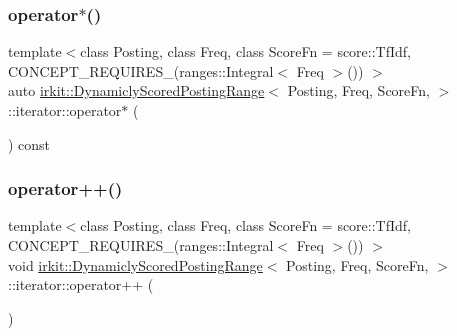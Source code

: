 \mbox{\label{classirkit_1_1DynamiclyScoredPostingRange_1_1iterator_a1608a0963401d8842b1f0e3726e44449}} 
\subsubsection{\texorpdfstring{operator$\ast$()}{operator*()}}
{\footnotesize\ttfamily template$<$class Posting, class Freq, class Score\+Fn = score\+::\+Tf\+Idf, C\+O\+N\+C\+E\+P\+T\+\_\+\+R\+E\+Q\+U\+I\+R\+E\+S\+\_\+(ranges\+::\+Integral$<$ Freq $>$()) $>$ \\
auto \hyperlink{classirkit_1_1DynamiclyScoredPostingRange}{irkit\+::\+Dynamicly\+Scored\+Posting\+Range}$<$ Posting, Freq, Score\+Fn, $>$\+::iterator\+::operator$\ast$ (\begin{DoxyParamCaption}{ }\end{DoxyParamCaption}) const\hspace{0.3cm}{\ttfamily [inline]}}

\mbox{\label{classirkit_1_1DynamiclyScoredPostingRange_1_1iterator_aeb75d55de7b324e3ff31aa7496a0f7c5}} 
\subsubsection{\texorpdfstring{operator++()}{operator++()}\hspace{0.1cm}{\footnotesize\ttfamily [1/2]}}
{\footnotesize\ttfamily template$<$class Posting, class Freq, class Score\+Fn = score\+::\+Tf\+Idf, C\+O\+N\+C\+E\+P\+T\+\_\+\+R\+E\+Q\+U\+I\+R\+E\+S\+\_\+(ranges\+::\+Integral$<$ Freq $>$()) $>$ \\
void \hyperlink{classirkit_1_1DynamiclyScoredPostingRange}{irkit\+::\+Dynamicly\+Scored\+Posting\+Range}$<$ Posting, Freq, Score\+Fn, $>$\+::iterator\+::operator++ (\begin{DoxyParamCaption}{ }\end{DoxyParamCaption})\hspace{0.3cm}{\ttfamily [inline]}}

